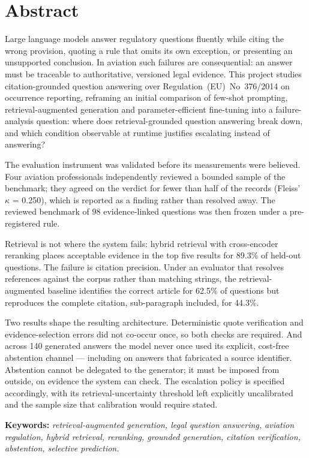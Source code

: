 \chapter*{Abstract}

Large language models answer regulatory questions fluently while citing the wrong
provision, quoting a rule that omits its own exception, or presenting an
unsupported conclusion. In aviation such failures are consequential: an answer
must be traceable to authoritative, versioned legal evidence. This project studies
citation-grounded question answering over Regulation~(EU)~No~376/2014 on
occurrence reporting, reframing an initial comparison of few-shot prompting,
retrieval-augmented generation and parameter-efficient fine-tuning into a
failure-analysis question: where does retrieval-grounded question answering break
down, and which condition observable at runtime justifies escalating instead of
answering?

The evaluation instrument was validated before its measurements were believed.
Four aviation professionals independently reviewed a bounded sample of the
benchmark; they agreed on the verdict for fewer than half of the records
(Fleiss' $\kappa$ = 0.250), which is reported as a finding rather than resolved
away. The reviewed benchmark of 98 evidence-linked questions
was then frozen under a pre-registered rule.

Retrieval is not where the system fails: hybrid retrieval with cross-encoder
reranking places acceptable evidence in the top five results for 89.3\% of
held-out questions. The failure is citation precision. Under an evaluator that resolves references
against the corpus rather than matching strings, the retrieval-augmented baseline
identifies the correct article for 62.5\% of questions but reproduces the complete
citation, sub-paragraph included, for 44.3\%.

Two results shape the resulting architecture. Deterministic quote verification
and evidence-selection errors did not co-occur once, so both checks are required.
And across 140 generated answers the model never once used its explicit,
cost-free abstention channel --- including on answers that fabricated a source
identifier. Abstention cannot be delegated to the generator; it must be imposed
from outside, on evidence the system can check. The escalation policy is
specified accordingly, with its retrieval-uncertainty threshold left explicitly
uncalibrated and the sample size that calibration would require stated.

\medskip
\noindent\textbf{\color{aivancityNavy}Keywords:}
\textit{\color{aivancityGray}retrieval-augmented generation, legal question answering, aviation regulation, hybrid retrieval, reranking, grounded generation, citation verification, abstention, selective prediction.}
